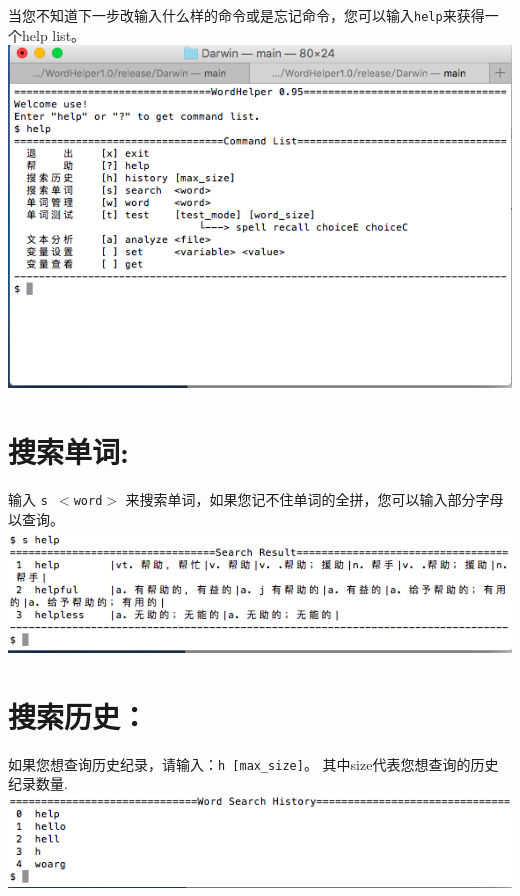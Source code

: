 当您不知道下一步改输入什么样的命令或是忘记命令，您可以输入\texttt{help}来获得一个help list。
\includegraphics[keepaspectratio,width=\textwidth,height=0.75\textheight]{picture1.png} 

\section{搜索单词:}
\label{}

输入 \texttt{s $<$word$>$} 来搜索单词，如果您记不住单词的全拼，您可以输入部分字母以查询。\includegraphics[keepaspectratio,width=\textwidth,height=0.75\textheight]{picture2.png}

\section{搜索历史：}
\label{}

如果您想查询历史纪录，请输入：\texttt{h [max\_size]}。 其中size代表您想查询的历史纪录数量. \includegraphics[keepaspectratio,width=\textwidth,height=0.75\textheight]{picture3.png}


